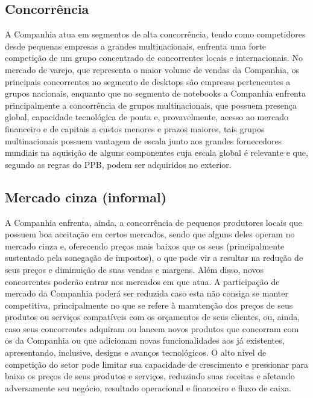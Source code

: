 \subsection{Concorrência} 
A Companhia atua em segmentos de alta concorrência, tendo como competidores desde pequenas empresas a grandes multinacionais, enfrenta uma forte competição de um grupo concentrado de concorrentes locais e internacionais.
No mercado de varejo, que representa o maior volume de vendas da Companhia, os principais concorrentes no segmento de desktops são empresas pertencentes a grupos nacionais, enquanto que no segmento de notebooks a Companhia enfrenta principalmente a concorrência de grupos multinacionais, que possuem presença global, capacidade tecnológica de ponta e, provavelmente, acesso ao mercado financeiro e de capitais a custos menores e prazos maiores, tais grupos multinacionais possuem vantagem de escala junto aos grandes fornecedores mundiais na aquisição de alguns componentes cuja escala global é relevante e que, segundo as regras do PPB, podem ser adquiridos no exterior.

\subsection{Mercado cinza (informal)}
A Companhia enfrenta, ainda, a concorrência de pequenos produtores locais que possuem boa aceitação em certos mercados, sendo que alguns deles operam no mercado cinza e, oferecendo preços mais baixos que os seus (principalmente sustentado pela sonegação de impostos), o que pode vir a resultar na redução de seus preços e diminuição de suas vendas e margens. Além disso, novos concorrentes poderão entrar nos mercados em que atua. A participação de mercado da Companhia poderá ser reduzida caso esta não consiga se manter competitiva, principalmente no que se refere à manutenção dos preços de seus produtos ou serviços compatíveis com os orçamentos de seus clientes, ou, ainda, caso seus concorrentes adquiram ou lancem novos produtos que concorram com os da Companhia ou que adicionam novas funcionalidades aos já existentes, apresentando, inclusive, designs e avanços tecnológicos. O alto nível de competição do setor pode limitar sua capacidade de crescimento e pressionar para baixo os preços de seus produtos e serviços, reduzindo suas receitas e afetando adversamente seu negócio, resultado operacional e financeiro e fluxo de caixa.

